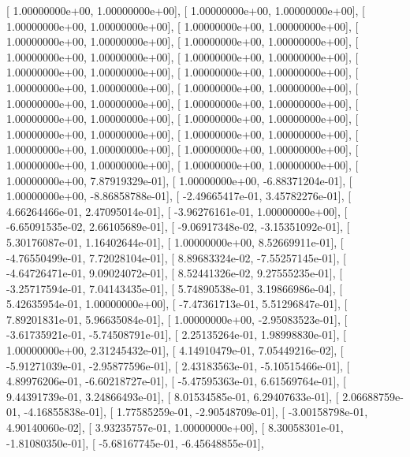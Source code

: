 \documentclass{article}
\begin{document}
       [  1.00000000e+00,   1.00000000e+00],
       [  1.00000000e+00,   1.00000000e+00],
       [  1.00000000e+00,   1.00000000e+00],
       [  1.00000000e+00,   1.00000000e+00],
       [  1.00000000e+00,   1.00000000e+00],
       [  1.00000000e+00,   1.00000000e+00],
       [  1.00000000e+00,   1.00000000e+00],
       [  1.00000000e+00,   1.00000000e+00],
       [  1.00000000e+00,   1.00000000e+00],
       [  1.00000000e+00,   1.00000000e+00],
       [  1.00000000e+00,   1.00000000e+00],
       [  1.00000000e+00,   1.00000000e+00],
       [  1.00000000e+00,   1.00000000e+00],
       [  1.00000000e+00,   1.00000000e+00],
       [  1.00000000e+00,   1.00000000e+00],
       [  1.00000000e+00,   1.00000000e+00],
       [  1.00000000e+00,   1.00000000e+00],
       [  1.00000000e+00,   1.00000000e+00],
       [  1.00000000e+00,   1.00000000e+00],
       [  1.00000000e+00,   1.00000000e+00],
       [  1.00000000e+00,   1.00000000e+00],
       [  1.00000000e+00,   1.00000000e+00],
       [  1.00000000e+00,   7.87919329e-01],
       [  1.00000000e+00,  -6.88371204e-01],
       [  1.00000000e+00,  -8.86858788e-01],
       [ -2.49665417e-01,   3.45782276e-01],
       [  4.66264466e-01,   2.47095014e-01],
       [ -3.96276161e-01,   1.00000000e+00],
       [ -6.65091535e-02,   2.66105689e-01],
       [ -9.06917348e-02,  -3.15351092e-01],
       [  5.30176087e-01,   1.16402644e-01],
       [  1.00000000e+00,   8.52669911e-01],
       [ -4.76550499e-01,   7.72028104e-01],
       [  8.89683324e-02,  -7.55257145e-01],
       [ -4.64726471e-01,   9.09024072e-01],
       [  8.52441326e-02,   9.27555235e-01],
       [ -3.25717594e-01,   7.04143435e-01],
       [  5.74890538e-01,   3.19866986e-04],
       [  5.42635954e-01,   1.00000000e+00],
       [ -7.47361713e-01,   5.51296847e-01],
       [  7.89201831e-01,   5.96635084e-01],
       [  1.00000000e+00,  -2.95083523e-01],
       [ -3.61735921e-01,  -5.74508791e-01],
       [  2.25135264e-01,   1.98998830e-01],
       [  1.00000000e+00,   2.31245432e-01],
       [  4.14910479e-01,   7.05449216e-02],
       [ -5.91271039e-01,  -2.95877596e-01],
       [  2.43183563e-01,  -5.10515466e-01],
       [  4.89976206e-01,  -6.60218727e-01],
       [ -5.47595363e-01,   6.61569764e-01],
       [  9.44391739e-01,   3.24866493e-01],
       [  8.01534585e-01,   6.29407633e-01],
       [  2.06688759e-01,  -4.16855838e-01],
       [  1.77585259e-01,  -2.90548709e-01],
       [ -3.00158798e-01,   4.90140060e-02],
       [  3.93235757e-01,   1.00000000e+00],
       [  8.30058301e-01,  -1.81080350e-01],
       [ -5.68167745e-01,  -6.45648855e-01],
\end{document}
